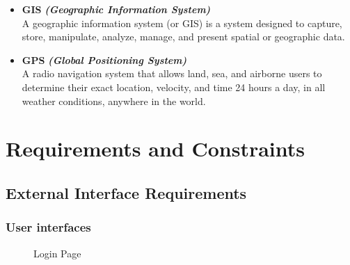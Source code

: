 \documentclass{article}
\begin{document}
			\begin{itemize}
				
				\item \textbf{GIS} \textbf{\textit{(Geographic Information System)}} \\
				\newline
				A geographic information system (or GIS) is a system designed to capture, store, manipulate, analyze, manage, and present spatial or geographic data.\\
				
				\item \textbf{GPS} \textbf{\textit{(Global Positioning System)}} \\
				\newline
				A radio navigation system that allows land, sea, and airborne users to determine their exact location, velocity, and time 24 hours a day, in all weather conditions, anywhere in the world.
			
			\end{itemize}

	\section{Requirements and Constraints}
		
		\subsection{External Interface Requirements}
		
			\subsubsection{User interfaces}
			
				\begin{figure}[H]
					
					\caption{Login Page}
					
					
				\end{figure}
			
\end{document}
